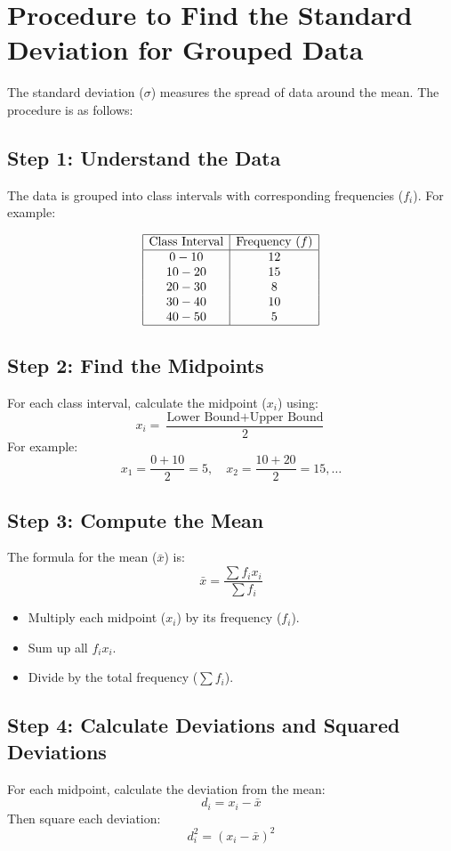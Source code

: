 \documentclass[10pt]{book}
\begin{document}
\section{Procedure to Find the Standard Deviation for Grouped Data}

The standard deviation (\( \sigma \)) measures the spread of data around the mean. The procedure is as follows:

\subsection*{Step 1: Understand the Data}
The data is grouped into class intervals with corresponding frequencies (\( f_i \)). For example:

\[
\begin{array}{|c|c|}
\hline
\text{Class Interval} & \text{Frequency (\( f \))} \\
\hline
0-10 & 12 \\
10-20 & 15 \\
20-30 & 8 \\
30-40 & 10 \\
40-50 & 5 \\
\hline
\end{array}
\]

\subsection*{Step 2: Find the Midpoints}
For each class interval, calculate the midpoint (\( x_i \)) using:
\[
x_i = \frac{\text{Lower Bound} + \text{Upper Bound}}{2}
\]
For example:
\[
x_1 = \frac{0 + 10}{2} = 5, \quad x_2 = \frac{10 + 20}{2} = 15, \dots
\]

\subsection*{Step 3: Compute the Mean}
The formula for the mean (\( \bar{x} \)) is:
\[
\bar{x} = \frac{\sum f_i x_i}{\sum f_i}
\]
\begin{itemize}
    \item Multiply each midpoint (\( x_i \)) by its frequency (\( f_i \)).
    \item Sum up all \( f_i x_i \).
    \item Divide by the total frequency (\( \sum f_i \)).
\end{itemize}

\subsection*{Step 4: Calculate Deviations and Squared Deviations}
For each midpoint, calculate the deviation from the mean:
\[
d_i = x_i - \bar{x}
\]
Then square each deviation:
\[
d_i^2 = (x_i - \bar{x})^2
\]
\end{document}
